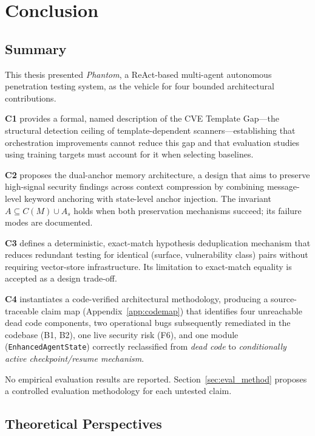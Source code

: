 \documentclass[12pt, a4paper, oneside, openany]{book}
\newcommand{\Phant}{\textit{Phantom}}
\newcommand{\code}[1]{\texttt{#1}}
\begin{document}
\chapter*{Conclusion}

\section*{Summary}

This thesis presented \Phant{}, a ReAct-based multi-agent autonomous
penetration testing system, as the vehicle for four bounded
architectural contributions.

\textbf{C1} provides a formal, named description of the CVE Template
Gap---the structural detection ceiling of template-dependent
scanners---establishing that orchestration improvements cannot reduce
this gap and that evaluation studies using training targets must
account for it when selecting baselines.

\textbf{C2} proposes the dual-anchor memory architecture, a design
that aims to preserve high-signal security findings across context
compression by combining message-level keyword anchoring with
state-level anchor injection.  The invariant $A \subseteq C(M) \cup
A_s$ holds when both preservation mechanisms succeed; its failure
modes are documented.

\textbf{C3} defines a deterministic, exact-match hypothesis
deduplication mechanism that reduces redundant testing for identical
(surface, vulnerability class) pairs without requiring vector-store
infrastructure.  Its limitation to exact-match equality is accepted
as a design trade-off.

\textbf{C4} instantiates a code-verified architectural methodology,
producing a source-traceable claim map (Appendix~\ref{app:codemap})
that identifies four unreachable dead code components, two
operational bugs subsequently remediated in the codebase (B1, B2),
one live security risk (F6), and one module (\code{EnhancedAgentState})
correctly reclassified from \textit{dead code} to
\textit{conditionally active checkpoint/resume mechanism}.

No empirical evaluation results are reported.  Section~\ref{sec:eval_method}
proposes a controlled evaluation methodology for each untested claim.

\section*{Theoretical Perspectives}
\end{document}
